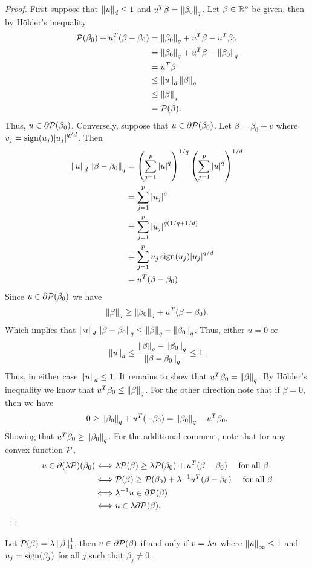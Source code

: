 \begin{proof}
    First suppose that $\left\|u\right\|_d \le 1$ and $u^T\beta = \left\|\beta_0\right\|_q$. Let $\beta \in {\mathbb R}^p$ be given, then by H\"older's inequality
    \begin{align*}
        {\mathcal{P}}(\beta_0)+u^T(\beta-\beta_0) &= \left\|\beta_0\right\|_q + u^T\beta - u^T\beta_0 \\
        &=\left\|\beta_0\right\|_q +u^T\beta - \left\|\beta_0\right\|_q\\
        &=u^T\beta \\
        &\le \left\|u\right\|_d\left\|\beta\right\|_q\\
        &\le \left\|\beta\right\|_q\\
        &={\mathcal{P}}(\beta).
    \end{align*}
    Thus, $u \in \partial {\mathcal{P}}(\beta_0)$. Conversely, suppose that $u \in \partial {\mathcal{P}}(\beta_0)$. Let $\beta = \beta_0+v$ where $v_j = \operatorname{sign}(u_j){\left\lvert u_j\right\rvert}^{q/d}$. Then 
    \begin{align*}
        \left\|u\right\|_d\left\|\beta-\beta_0\right\|_q &=\left(\sum_{j=1}^p {\left\lvert u\right\rvert}^{q}\right)^{1/q}\left(\sum_{j=1}^p {\left\lvert u\right\rvert}^q\right)^{1/d}\\
        &= \sum_{j=1}^p {\left\lvert u_j\right\rvert}^{q}\\
        &=\sum_{j=1}^p {\left\lvert u_j\right\rvert}^{q(1/q+1/d)}\\
        &=\sum_{j=1}^p u_j \operatorname{sign}(u_j){\left\lvert u_j\right\rvert}^{q/d}\\
        &=u^T(\beta-\beta_0)
    \end{align*}
    Since $u \in \partial {\mathcal{P}}(\beta_0)$ we have 
    \[\left\|\beta\right\|_q \ge \left\|\beta_0\right\|_q + u^T(\beta-\beta_0).\]
    Which implies that $\left\|u\right\|_d\left\|\beta-\beta_0\right\|_q \le \left\|\beta\right\|_q-\left\|\beta_0\right\|_q$.  Thus, either $u = 0$ or 
    \[\left\|u\right\|_d \le \frac{\left\|\beta\right\|_q-\left\|\beta_0\right\|_q}{\left\|\beta-\beta_0\right\|_q}\le 1. \]
    Thus, in either case $\left\|u\right\|_d \le1$. It remains to show that $u^T\beta_0 = \left\|\beta\right\|_q$. By H\"older's inequality we know that $u^T\beta_0 \le \left\|\beta\right\|_q$. For the other direction note that if $\beta = 0$, then we have
    \[0 \ge \left\|\beta_0\right\|_q + u^T(-\beta_0)=\left\|\beta_0\right\|_q-u^T\beta_0. \]
    Showing that $u^T\beta_0 \ge \left\|\beta_0\right\|_q$. For the additional comment, note that for any convex function ${\mathcal{P}}$,
    \begin{align*}
        u \in \partial(\lambda {\mathcal{P}})(\beta_0) &\Longleftrightarrow \lambda{\mathcal{P}}(\beta) \ge \lambda{\mathcal{P}}(\beta_0)+u^T(\beta-\beta_0) ~~~ \text{ for all } \beta\\
        &\Longleftrightarrow {\mathcal{P}}(\beta) \ge {\mathcal{P}}(\beta_0)+\lambda^{-1}u^T(\beta-\beta_0) ~~~ \text{ for all } \beta\\
        &\Longleftrightarrow \lambda^{-1}u \in \partial{\mathcal{P}}(\beta)\\
        &\Longleftrightarrow u \in \lambda\partial {\mathcal{P}}(\beta).\qedhere 
    \end{align*}
\end{proof}
\begin{corollary}
    Let ${\mathcal{P}}(\beta)=\lambda \left\|\beta\right\|_1^1$, then $v \in \partial {\mathcal{P}}(\beta)$ if and only if $v = \lambda u$ where $\left\|u\right\|_\infty \le 1$ and $u_j = \operatorname{sign}(\beta_j)$ for all $j$ such that $\beta_j \neq 0$.
\end{corollary}
